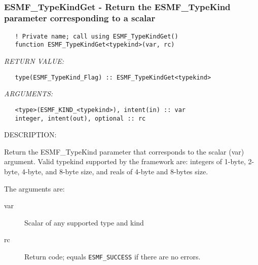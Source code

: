  
\mbox{}\hrulefill\ 
 
\subsubsection [ESMF\_TypeKindGet] {ESMF\_TypeKindGet - Return the ESMF\_TypeKind parameter corresponding to a scalar }


   
\begin{verbatim}   ! Private name; call using ESMF_TypeKindGet() 
   function ESMF_TypeKindGet<typekind>(var, rc) 
   \end{verbatim}{\em RETURN VALUE:}
\begin{verbatim}   type(ESMF_TypeKind_Flag) :: ESMF_TypeKindGet<typekind> 
   \end{verbatim}{\em ARGUMENTS:}
\begin{verbatim}   <type>(ESMF_KIND_<typekind>), intent(in) :: var 
   integer, intent(out), optional :: rc 
   \end{verbatim}
{\sf DESCRIPTION:\\ }

 
   Return the ESMF_TypeKind parameter that corresponds to the scalar 
   (var) argument. Valid typekind supported by the framework are: 
   integers of 1-byte, 2-byte, 4-byte, and 8-byte size, and 
   reals of 4-byte and 8-bytes size. 
   
   The arguments are: 
   \begin{description} 
   \item [var] 
   Scalar of any supported type and kind 
   \item [rc] 
   Return code; equals {\tt ESMF\_SUCCESS} if there are no errors. 
   \end{description} 
   
\setlength{\parskip}{\oldparskip}
\setlength{\parindent}{\oldparindent}
\setlength{\baselineskip}{\oldbaselineskip}
